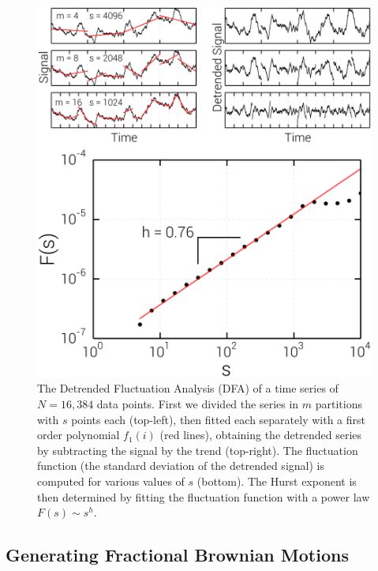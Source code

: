 \begin{figure}[t]
    \begin{center}
        \includegraphics[width=\textwidth]{chapters/ch6-asle/figs/dfa}
    \end{center}
    \caption{The Detrended Fluctuation Analysis (DFA) of a time series of
        $N=16,384$ data points. First we divided the series in $m$ partitions with
        $s$ points each (top-left), then fitted each separately with a first order
        polynomial $f_1(i)$ (red lines), obtaining the detrended series by subtracting
        the signal by the trend (top-right).  The fluctuation function (the standard
        deviation of the detrended signal) is computed for various values of $s$
        (bottom).  The Hurst exponent is then determined by fitting the fluctuation
        function with a power law $F(s)\sim s^h$.}
\label{fig:dfa}
\end{figure}


\subsection{Generating Fractional Brownian Motions}
\label{sec:fbm}

